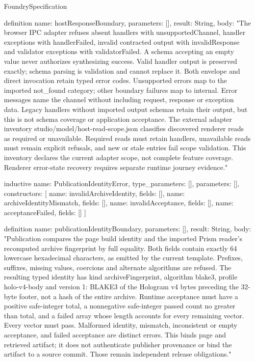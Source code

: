 \begin{lexlean}{FoundrySpecification}
\begin{semanticmodule}
definition{
  name: hostResponseBoundary,
  parameters: [],
  result: String,
  body: "The browser IPC adapter refuses absent handlers with unsupportedChannel, handler exceptions with handlerFailed, invalid contracted output with invalidResponse and validator exceptions with validatorFailed. A schema accepting an empty value never authorizes synthesizing success. Valid handler output is preserved exactly; schema parsing is validation and cannot replace it. Both envelope and direct invocation retain typed error codes. Unsupported errors map to the imported not_found category; other boundary failures map to internal. Error messages name the channel without including request, response or exception data. Legacy handlers without imported output schemas retain their output, but this is not schema coverage or application acceptance. The external adapter inventory studio/model/host-read-scope.json classifies discovered renderer reads as required or unavailable. Required reads must retain handlers, unavailable reads must remain explicit refusals, and new or stale entries fail scope validation. This inventory declares the current adapter scope, not complete feature coverage. Renderer error-state recovery requires separate runtime journey evidence."
}

inductive{
  name: PublicationIdentityError,
  type_parameters: [],
  parameters: [],
  constructors: [
    {name: invalidArchiveIdentity, fields: []},
    {name: archiveIdentityMismatch, fields: []},
    {name: invalidAcceptance, fields: []},
    {name: acceptanceFailed, fields: []}
  ]
}

definition{
  name: publicationIdentityBoundary,
  parameters: [],
  result: String,
  body: "Publication compares the page build identity and the imported Prism reader's recomputed archive fingerprint by full equality. Both fields contain exactly 64 lowercase hexadecimal characters, as emitted by the current template. Prefixes, suffixes, missing values, coercions and alternate algorithms are refused. The resulting typed identity has kind archiveFingerprint, algorithm blake3, profile holo-v4-body and version 1: BLAKE3 of the Hologram v4 bytes preceding the 32-byte footer, not a hash of the entire archive. Runtime acceptance must have a positive safe-integer total, a nonnegative safe-integer passed count no greater than total, and a failed array whose length accounts for every remaining vector. Every vector must pass. Malformed identity, mismatch, inconsistent or empty acceptance, and failed acceptance are distinct errors. This binds page and retrieved artifact; it does not authenticate publisher provenance or bind the artifact to a source commit. Those remain independent release obligations."
}


\end{semanticmodule}
\end{lexlean}
